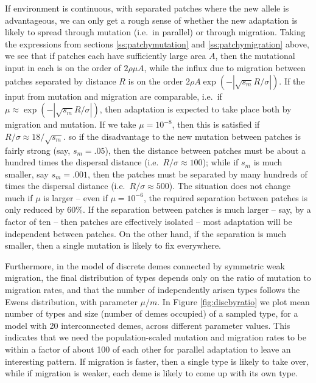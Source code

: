 \documentclass{article}
\begin{document}
{If environment is continuous, with separated patches where the new allele is advantageous,
we can only get a rough sense of whether the new adaptation is likely to spread through mutation (i.e.\ in parallel)
or through migration.
Taking the expressions from sections \ref{ss:patchymutation} and \ref{ss:patchymigration} above,
we see that if patches each have sufficiently large area $A$,
then the mutational input in each is on the order of $2 \rho \mu A$,
while the influx due to migration between patches separated by distance $R$ is on the order $2 \rho A \exp(- |\sqrt{s_m} R/\sigma|)$. 
If the input from mutation and migration are comparable, i.e.\ if $\mu \approx \exp( -|\sqrt{s_m} R/\sigma| )$,
then adaptation is expected to take place both by migration and mutation.
If we take $\mu = 10^{-8}$, then this is satisfied if $R/\sigma \approx 18/\sqrt{s_m}$.
so if the disadvantage to the new mutation between patches is fairly strong (say, $s_m=.05$),
then the distance between patches must be about a hundred times the dispersal distance (i.e.\ $R/\sigma \approx 100$);
while if $s_m$ is much smaller, say $s_m = .001$, 
then the patches must be separated by many hundreds of times the dispersal distance (i.e.\ $R/\sigma \approx 500$).
The situation does not change much if $\mu$ is larger -- even if $\mu = 10^{-6}$, 
the required separation between patches is only reduced by 60\%.
If the separation between patches is much larger -- say, by a factor of ten -- 
then patches are effectively isolated -- most adaptation will be independent between patches.
On the other hand, if the separation is much smaller, then a single mutation is likely to fix everywhere.

Furthermore, in the model of discrete demes connected by symmetric weak migration, 
the final distribution of types depends only on the ratio of mutation to migration rates,
and that the number of independently arisen types follows the Ewens distribution, with parameter $\mu/m$.
In Figure \ref{fig:discbyratio} we plot mean number of types and size (number of demes occupied) of a sampled type,
for a model with 20 interconnected demes, across different parameter values.  
This indicates that we need the population-scaled mutation and migration rates 
to be within a factor of about 100 of each other for parallel adaptation to leave an interesting pattern.  
If migration is faster, then a single type is likely to take over, while if migration is weaker, each deme is likely to come up with its own type.

}
\end{document}
